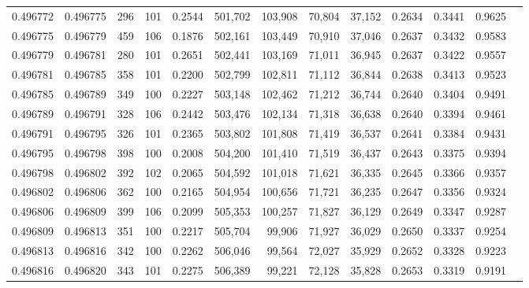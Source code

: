 \begin{tabular}{rrrrrrrrrrrrr}
0.496772 & 0.496775 &   296 & 101 &                                     0.2544 & 501,702 & 103,908 &  70,804 &  37,152 & 0.2634 & 0.3441 & 0.9625 \\
0.496775 & 0.496779 &   459 & 106 &                                     0.1876 & 502,161 & 103,449 &  70,910 &  37,046 & 0.2637 & 0.3432 & 0.9583 \\
0.496779 & 0.496781 &   280 & 101 &                                     0.2651 & 502,441 & 103,169 &  71,011 &  36,945 & 0.2637 & 0.3422 & 0.9557 \\
0.496781 & 0.496785 &   358 & 101 &                                     0.2200 & 502,799 & 102,811 &  71,112 &  36,844 & 0.2638 & 0.3413 & 0.9523 \\
0.496785 & 0.496789 &   349 & 100 &                                     0.2227 & 503,148 & 102,462 &  71,212 &  36,744 & 0.2640 & 0.3404 & 0.9491 \\
0.496789 & 0.496791 &   328 & 106 &                                     0.2442 & 503,476 & 102,134 &  71,318 &  36,638 & 0.2640 & 0.3394 & 0.9461 \\
0.496791 & 0.496795 &   326 & 101 &                                     0.2365 & 503,802 & 101,808 &  71,419 &  36,537 & 0.2641 & 0.3384 & 0.9431 \\
0.496795 & 0.496798 &   398 & 100 &                                     0.2008 & 504,200 & 101,410 &  71,519 &  36,437 & 0.2643 & 0.3375 & 0.9394 \\
0.496798 & 0.496802 &   392 & 102 &                                     0.2065 & 504,592 & 101,018 &  71,621 &  36,335 & 0.2645 & 0.3366 & 0.9357 \\
0.496802 & 0.496806 &   362 & 100 &                                     0.2165 & 504,954 & 100,656 &  71,721 &  36,235 & 0.2647 & 0.3356 & 0.9324 \\
0.496806 & 0.496809 &   399 & 106 &                                     0.2099 & 505,353 & 100,257 &  71,827 &  36,129 & 0.2649 & 0.3347 & 0.9287 \\
0.496809 & 0.496813 &   351 & 100 &                                     0.2217 & 505,704 &  99,906 &  71,927 &  36,029 & 0.2650 & 0.3337 & 0.9254 \\
0.496813 & 0.496816 &   342 & 100 &                                     0.2262 & 506,046 &  99,564 &  72,027 &  35,929 & 0.2652 & 0.3328 & 0.9223 \\
0.496816 & 0.496820 &   343 & 101 &                                     0.2275 & 506,389 &  99,221 &  72,128 &  35,828 & 0.2653 & 0.3319 & 0.9191 \\

\end{tabular}
